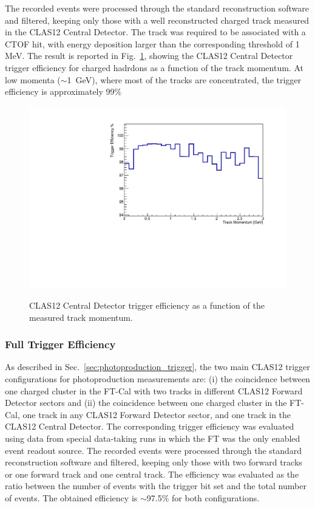 The recorded events were processed through the standard reconstruction software and filtered, keeping only those with a well reconstructed charged track measured in the CLAS12 Central Detector. The track was required to be associated with a CTOF hit, with energy deposition larger than the corresponding threshold of 1 MeV. The result is reported in Fig.~\ref{fig:CD_TrackEfficiency}, showing the CLAS12 Central Detector trigger efficiency for charged hadrdons as a function of the track momentum. At low momenta (${\sim}$1~GeV), where most of the tracks are concentrated, the trigger efficiency is approximately 99$\%$

\begin{figure}[!htb]
 \centering
{\includegraphics[width=.5\textwidth]{img/CD_TrackEfficiency.pdf}}
 \caption{CLAS12 Central Detector trigger efficiency as a function of the measured track momentum.}
 \label{fig:CD_TrackEfficiency}
\end{figure}

\subsubsection{Full Trigger Efficiency}
As described in Sec.~\ref{sec:photoproduction_trigger}, the two main CLAS12 trigger configurations for photoproduction measurements are: (i) the coincidence between one charged cluster in the FT-Cal with two tracks in different CLAS12 Forward Detector sectors and (ii) the coincidence between one charged cluster in the FT-Cal, one track in any CLAS12 Forward Detector sector, and one track in the CLAS12 Central Detector. The corresponding trigger efficiency was evaluated using data from special data-taking runs in which the FT was the only enabled event readout source. The recorded events were processed through the standard reconstruction software and filtered, keeping only those with two forward tracks or one forward track and one central track. The efficiency was evaluated as the ratio between the number of events with the trigger bit set and the total number of events. The obtained efficiency is $\sim$97.5$\%$ for both configurations. 
